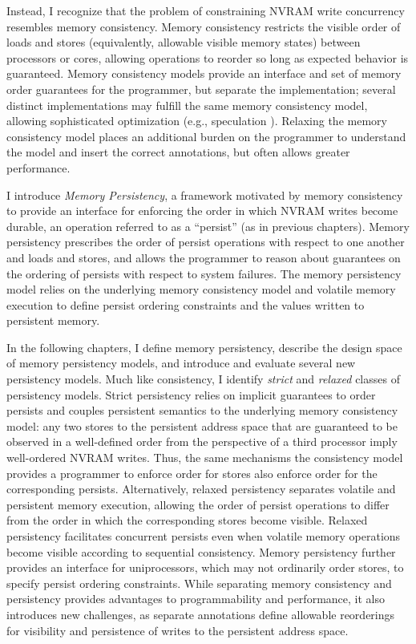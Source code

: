 Instead, I recognize that the problem of constraining NVRAM write concurrency resembles memory consistency.
Memory consistency restricts the visible order of loads and stores (equivalently, allowable visible memory states) between processors or cores, allowing operations to reorder so long as expected behavior is guaranteed.
Memory consistency models provide an interface and set of memory order guarantees for the programmer, but separate the implementation; several distinct implementations may fulfill the same memory consistency model, allowing sophisticated optimization (e.g., speculation \cite{Blundell09,Wenisch07,Ceze07,Gniady99,Ranganathan97}).
Relaxing the memory consistency model places an additional burden on the programmer to understand the model and insert the correct annotations, but often allows greater performance.

I introduce \emph{Memory Persistency}, a framework motivated by memory consistency to provide an interface for enforcing the order in which NVRAM writes become durable, an operation referred to as a ``persist'' (as in previous chapters).
Memory persistency prescribes the order of persist operations with respect to one another and loads and stores, and allows the programmer to reason about guarantees on the ordering of persists with respect to system failures.
The memory persistency model relies on the underlying memory consistency model and volatile memory execution to define persist ordering constraints and the values written to persistent memory.

In the following chapters, I define memory persistency, describe the design space of memory persistency models, and introduce and evaluate several new persistency models.
Much like consistency, I identify \emph{strict} and \emph{relaxed} classes of persistency models.
Strict persistency relies on implicit guarantees to order persists and couples persistent semantics to the underlying memory consistency model: any two stores to the persistent address space that are guaranteed to be observed in a well-defined order from the perspective of a third processor imply well-ordered NVRAM writes.
Thus, the same mechanisms the consistency model provides a programmer to enforce order for stores also enforce order for the corresponding persists. 
Alternatively, relaxed persistency separates volatile and persistent memory execution, allowing the order of persist operations to differ from the order in which the corresponding stores become visible.
Relaxed persistency facilitates concurrent persists even when volatile memory operations become visible according to sequential consistency.
Memory persistency further provides an interface for uniprocessors, which may not ordinarily order stores, to specify persist ordering constraints.
While separating memory consistency and persistency provides advantages to programmability and performance, it also introduces new challenges, as separate annotations define allowable reorderings for visibility and persistence of writes to the persistent address space.


